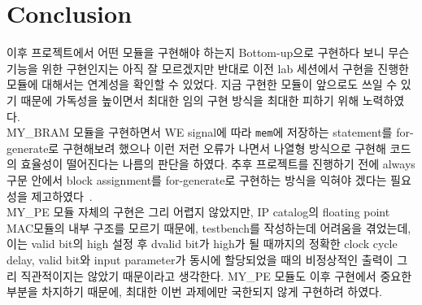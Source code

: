 \documentclass{article}
\newcommand{\orange}[1]{{\color{orange} #1}}
\begin{document}
\section{Conclusion}
\orange{
이후 프로젝트에서 어떤 모듈을 구현해야 하는지 Bottom-up으로 구현하다 보니 무슨 기능을 위한 구현인지는 아직 잘 모르겠지만 반대로 이전 lab 세션에서 구현을 진행한 모듈에 대해서는 연계성을 확인할 수 있었다. 지금 구현한 모듈이 앞으로도 쓰일 수 있기 때문에 가독성을 높이면서 최대한 임의 구현 방식을 최대한 피하기 위해 노력하였다. \\

MY\_BRAM 모듈을 구현하면서 WE signal에 따라 \texttt{mem}에 저장하는 statement를 for-generate로 구현해보려 했으나 이런 저런 오류가 나면서 나열형 방식으로 구현해 코드의 효율성이 떨어진다는 나름의 판단을 하였다. 추후 프로젝트를 진행하기 전에 always 구문 안에서 block assignment를 for-generate로 구현하는 방식을 익혀야 겠다는 필요성을 제고하였다~\cite{thomas2008verilog}.\\

MY\_PE 모듈 자체의 구현은 그리 어렵지 않았지만, IP catalog의 floating point MAC모듈의 내부 구조를 모르기 때문에, testbench를 작성하는데 어려움을 겪었는데, 이는 valid bit의 high 설정 후 dvalid bit가 high가 될 때까지의 정확한 clock cycle delay, valid bit와 input parameter가 동시에 할당되었을 때의 비정상적인 출력이 그리 직관적이지는 않았기 때문이라고 생각한다. MY\_PE 모듈도 이후 구현에서 중요한 부분을 차지하기 때문에, 최대한 이번 과제에만 국한되지 않게 구현하려 하였다. 
}



\end{document}
